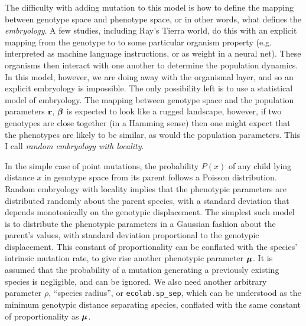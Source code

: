 \documentclass{article}
\newcommand{\br}{\mbox{${\bf r}$}} %
\newcommand{\bbeta}{\mbox{\boldmath{$\beta$}}}   %
\newcommand{\bmu}{\mbox{\boldmath{$\mu$}}}       %
\begin{document}
The difficulty with adding mutation to this model is how to define the
mapping between genotype space and phenotype space, or in other words,
what defines the {\em embryology}. A few studies, including Ray's
Tierra world\cite{Ray91}, do this with an explicit mapping from the
genotype to to some particular organism property (e.g. interpreted as
machine language instructions, or as weight in a neural net). These
organisms then interact with one another to determine the population
dynamics. In this model, however, we are doing away with the
organismal layer, and so an explicit embryology is impossible. The
only possibility left is to use a statistical model of embryology. The
mapping between genotype space and the population parameters $\br$,
$\bbeta{}$ is expected to look like a rugged landscape, however, if
two genotypes are close together (in a Hamming sense) then one might
expect that the phenotypes are likely to be similar, as would the
population parameters. This I call {\em random embryology with
  locality}.

In the simple case of point mutations, the probability $P(x)$ of any
child lying distance $x$ in genotype space from its parent follows a
Poisson distribution. Random embryology with locality implies that the
phenotypic parameters are distributed randomly about the parent
species, with a standard deviation that depends monotonically on the
genotypic displacement. The simplest such model is to distribute the
phenotypic parameters in a Gaussian fashion about the parent's values,
with standard deviation proportional to the genotypic displacement.
This constant of proportionality can be conflated with the species'
intrinsic mutation rate, to give rise another phenotypic parameter
$\bmu$.  It is assumed that the probability of a mutation generating a
previously existing species is negligible, and can be ignored. We also
need another arbitrary parameter $\rho$, ``species radius'', or
\verb+ecolab.sp_sep+, which can be understood as the
minimum genotypic distance separating species, conflated with the same
constant of proportionality as $\bmu$.
\end{document}
